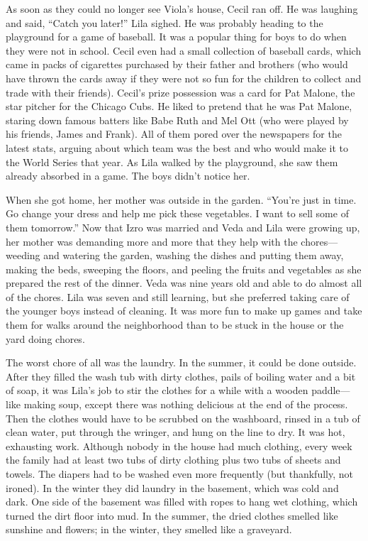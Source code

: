 \documentclass[
  letterpaper,
]{book}
\begin{document}
As soon as they could no longer see Viola's house, Cecil ran off. He was
laughing and said, ``Catch you later!'' Lila sighed. He was probably
heading to the playground for a game of baseball. It was a popular thing
for boys to do when they were not in school. Cecil even had a small
collection of baseball cards, which came in packs of cigarettes
purchased by their father and brothers (who would have thrown the cards
away if they were not so fun for the children to collect and trade with
their friends). Cecil's prize possession was a card for Pat Malone, the
star pitcher for the Chicago Cubs. He liked to pretend that he was Pat
Malone, staring down famous batters like Babe Ruth and Mel Ott (who were
played by his friends, James and Frank). All of them pored over the
newspapers for the latest stats, arguing about which team was the best
and who would make it to the World Series that year. As Lila walked by
the playground, she saw them already absorbed in a game. The boys didn't
notice her.

When she got home, her mother was outside in the garden. ``You're just
in time. Go change your dress and help me pick these vegetables. I want
to sell some of them tomorrow.'' Now that Izro was married and Veda and
Lila were growing up, her mother was demanding more and more that they
help with the chores---weeding and watering the garden, washing the
dishes and putting them away, making the beds, sweeping the floors, and
peeling the fruits and vegetables as she prepared the rest of the
dinner. Veda was nine years old and able to do almost all of the chores.
Lila was seven and still learning, but she preferred taking care of the
younger boys instead of cleaning. It was more fun to make up games and
take them for walks around the neighborhood than to be stuck in the
house or the yard doing chores.

The worst chore of all was the laundry. In the summer, it could be done
outside. After they filled the wash tub with dirty clothes, pails of
boiling water and a bit of soap, it was Lila's job to stir the clothes
for a while with a wooden paddle---like making soup, except there was
nothing delicious at the end of the process. Then the clothes would have
to be scrubbed on the washboard, rinsed in a tub of clean water, put
through the wringer, and hung on the line to dry. It was hot, exhausting
work. Although nobody in the house had much clothing, every week the
family had at least two tubs of dirty clothing plus two tubs of sheets
and towels. The diapers had to be washed even more frequently (but
thankfully, not ironed). In the winter they did laundry in the basement,
which was cold and dark. One side of the basement was filled with ropes
to hang wet clothing, which turned the dirt floor into mud. In the
summer, the dried clothes smelled like sunshine and flowers; in the
winter, they smelled like a graveyard.
\end{document}
